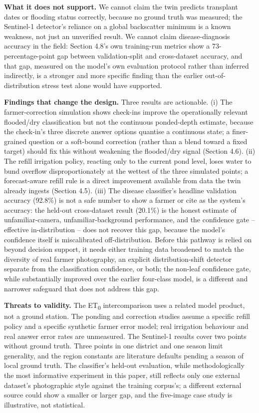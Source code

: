 \documentclass[11pt,a4paper]{article}
\begin{document}
\textbf{What it does not support.} We cannot claim the twin predicts transplant dates or flooding status correctly, because no ground truth was measured; the Sentinel-1 detector's reliance on a global backscatter minimum is a known weakness, not just an unverified result. We cannot claim disease-diagnosis accuracy in the field: Section 4.8's own training-run metrics show a 73-percentage-point gap between validation-split and cross-dataset accuracy, and that gap, measured on the model's own evaluation protocol rather than inferred indirectly, is a stronger and more specific finding than the earlier out-of-distribution stress test alone would have supported.

\textbf{Findings that change the design.} Three results are actionable. (i) The farmer-correction simulation shows check-ins improve the operationally relevant flooded/dry classification but not the continuous ponded-depth estimate, because the check-in's three discrete answer options quantise a continuous state; a finer-grained question or a soft-bound correction (rather than a blend toward a fixed target) should fix this without weakening the flooded/dry signal (Section 4.6). (ii) The refill irrigation policy, reacting only to the current pond level, loses water to bund overflow disproportionately at the wettest of the three simulated points; a forecast-aware refill rule is a direct improvement available from data the twin already ingests (Section 4.5). (iii) The disease classifier's headline validation accuracy (92.8\%) is not a safe number to show a farmer or cite as the system's accuracy: the held-out cross-dataset result (20.1\%) is the honest estimate of unfamiliar-camera, unfamiliar-background performance, and the confidence gate -- effective in-distribution -- does not recover this gap, because the model's confidence itself is miscalibrated off-distribution. Before this pathway is relied on beyond decision support, it needs either training data broadened to match the diversity of real farmer photography, an explicit distribution-shift detector separate from the classification confidence, or both; the non-leaf confidence gate, while substantially improved over the earlier four-class model, is a different and narrower safeguard that does not address this gap.

\textbf{Threats to validity.} The ET\textsubscript{0} intercomparison uses a related model product, not a ground station. The ponding and correction studies assume a specific refill policy and a specific synthetic farmer error model; real irrigation behaviour and real answer error rates are unmeasured. The Sentinel-1 results cover two points without ground truth. Three points in one district and one season limit generality, and the region constants are literature defaults pending a season of local ground truth. The classifier's held-out evaluation, while methodologically the most informative experiment in this paper, still reflects only one external dataset's photographic style against the training corpus's; a different external source could show a smaller or larger gap, and the five-image case study is illustrative, not statistical.
\end{document}
